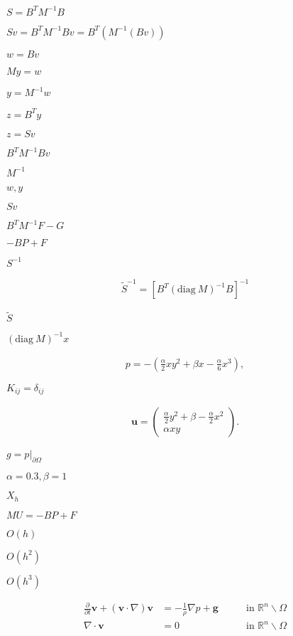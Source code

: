 \documentclass{article}
\begin{document}
$S=B^TM^{-1}B$
\pagebreak

$Sv=B^TM^{-1}Bv=B^T(M^{-1}(Bv))$
\pagebreak

$w = B v$
\pagebreak

$My = w$
\pagebreak

$y=M^{-1}w$
\pagebreak

$z=B^Ty$
\pagebreak

$z=Sv$
\pagebreak

$B^TM^{-1}Bv$
\pagebreak

$M^{-1}$
\pagebreak

$w,y$
\pagebreak

$Sv$
\pagebreak

$B^TM^{-1}F-G$
\pagebreak

$-BP+F$
\pagebreak

$S^{-1}$
\pagebreak

\begin{eqnarray*} \tilde S^{-1} = [B^T ({\textrm{diag}\ }M)^{-1}B]^{-1} \end{eqnarray*}
\pagebreak

$\tilde S$
\pagebreak

$({\textrm{diag}\ }M)^{-1}x$
\pagebreak

\begin{eqnarray*} p = -\left(\frac \alpha 2 xy^2 + \beta x - \frac \alpha 6 x^3\right), \end{eqnarray*}
\pagebreak

$K_{ij}=\delta_{ij}$
\pagebreak

\begin{eqnarray*} {\mathbf u} = \left(\begin{array}{cc} \frac \alpha 2 y^2 + \beta - \frac \alpha 2 x^2 \\ \alpha xy \end{array}\right). \end{eqnarray*}
\pagebreak

$g=p|_{\partial\Omega}$
\pagebreak

$\alpha=0.3,\beta=1$
\pagebreak

$X_h$
\pagebreak

$MU=-BP+F$
\pagebreak

$O(h)$
\pagebreak

$O(h^2)$
\pagebreak

$O(h^3)$
\pagebreak

\begin{align*} \frac{\partial }{\partial t}\mathbf{v} + (\mathbf{v}\cdot\nabla)\mathbf{v} &= -\frac{1}{\rho}\nabla p + \mathbf{g} \qquad &\text{in } \mathbb{R}^n \backslash \Omega \\ \nabla \cdot \mathbf{v}&=0 &\text{in } \mathbb{R}^n\backslash\Omega \end{align*}
\pagebreak
\end{document}
